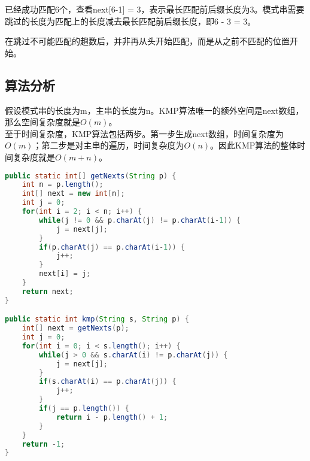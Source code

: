已经成功匹配6个，查看next[6-1] = 3，表示最长匹配前后缀长度为3。模式串需要跳过的长度为匹配上的长度减去最长匹配前后缀长度，即6 - 3 = 3。

\begin{table}[H]
	\centering
\end{table}

在跳过不可能匹配的趟数后，并非再从头开始匹配，而是从之前不匹配的位置开始。

\subsection{算法分析}

假设模式串的长度为m，主串的长度为n。KMP算法唯一的额外空间是next数组，那么空间复杂度就是$ O(m) $。 \\

至于时间复杂度，KMP算法包括两步。第一步生成next数组，时间复杂度为$ O(m) $；第二步是对主串的遍历，时间复杂度为$ O(n) $。因此KMP算法的整体时间复杂度就是$ O(m + n) $。 \\


\begin{lstlisting}[language=Java]
public static int[] getNexts(String p) {
	int n = p.length();
	int[] next = new int[n];
	int j = 0;
	for(int i = 2; i < n; i++) {
		while(j != 0 && p.charAt(j) != p.charAt(i-1)) {
			j = next[j];
		}
		if(p.charAt(j) == p.charAt(i-1)) {
			j++;
		}
		next[i] = j;
	}
	return next;
}

public static int kmp(String s, String p) {
	int[] next = getNexts(p);
	int j = 0;
	for(int i = 0; i < s.length(); i++) {
		while(j > 0 && s.charAt(i) != p.charAt(j)) {
			j = next[j];
		}
		if(s.charAt(i) == p.charAt(j)) {
			j++;
		}
		if(j == p.length()) {
			return i - p.length() + 1;
		}
	}
	return -1;
}
\end{lstlisting}

\newpage